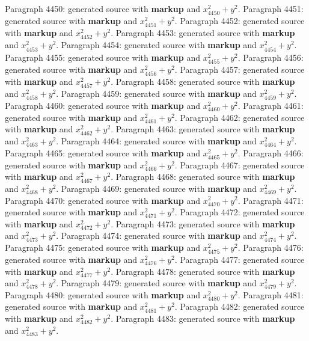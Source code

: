 \documentclass{article}
\begin{document}
Paragraph 4450: generated source with \textbf{markup} and $x_{4450}^2 + y^2$.
Paragraph 4451: generated source with \textbf{markup} and $x_{4451}^2 + y^2$.
Paragraph 4452: generated source with \textbf{markup} and $x_{4452}^2 + y^2$.
Paragraph 4453: generated source with \textbf{markup} and $x_{4453}^2 + y^2$.
Paragraph 4454: generated source with \textbf{markup} and $x_{4454}^2 + y^2$.
Paragraph 4455: generated source with \textbf{markup} and $x_{4455}^2 + y^2$.
Paragraph 4456: generated source with \textbf{markup} and $x_{4456}^2 + y^2$.
Paragraph 4457: generated source with \textbf{markup} and $x_{4457}^2 + y^2$.
Paragraph 4458: generated source with \textbf{markup} and $x_{4458}^2 + y^2$.
Paragraph 4459: generated source with \textbf{markup} and $x_{4459}^2 + y^2$.
Paragraph 4460: generated source with \textbf{markup} and $x_{4460}^2 + y^2$.
Paragraph 4461: generated source with \textbf{markup} and $x_{4461}^2 + y^2$.
Paragraph 4462: generated source with \textbf{markup} and $x_{4462}^2 + y^2$.
Paragraph 4463: generated source with \textbf{markup} and $x_{4463}^2 + y^2$.
Paragraph 4464: generated source with \textbf{markup} and $x_{4464}^2 + y^2$.
Paragraph 4465: generated source with \textbf{markup} and $x_{4465}^2 + y^2$.
Paragraph 4466: generated source with \textbf{markup} and $x_{4466}^2 + y^2$.
Paragraph 4467: generated source with \textbf{markup} and $x_{4467}^2 + y^2$.
Paragraph 4468: generated source with \textbf{markup} and $x_{4468}^2 + y^2$.
Paragraph 4469: generated source with \textbf{markup} and $x_{4469}^2 + y^2$.
Paragraph 4470: generated source with \textbf{markup} and $x_{4470}^2 + y^2$.
Paragraph 4471: generated source with \textbf{markup} and $x_{4471}^2 + y^2$.
Paragraph 4472: generated source with \textbf{markup} and $x_{4472}^2 + y^2$.
Paragraph 4473: generated source with \textbf{markup} and $x_{4473}^2 + y^2$.
Paragraph 4474: generated source with \textbf{markup} and $x_{4474}^2 + y^2$.
Paragraph 4475: generated source with \textbf{markup} and $x_{4475}^2 + y^2$.
Paragraph 4476: generated source with \textbf{markup} and $x_{4476}^2 + y^2$.
Paragraph 4477: generated source with \textbf{markup} and $x_{4477}^2 + y^2$.
Paragraph 4478: generated source with \textbf{markup} and $x_{4478}^2 + y^2$.
Paragraph 4479: generated source with \textbf{markup} and $x_{4479}^2 + y^2$.
Paragraph 4480: generated source with \textbf{markup} and $x_{4480}^2 + y^2$.
Paragraph 4481: generated source with \textbf{markup} and $x_{4481}^2 + y^2$.
Paragraph 4482: generated source with \textbf{markup} and $x_{4482}^2 + y^2$.
Paragraph 4483: generated source with \textbf{markup} and $x_{4483}^2 + y^2$.
\end{document}
